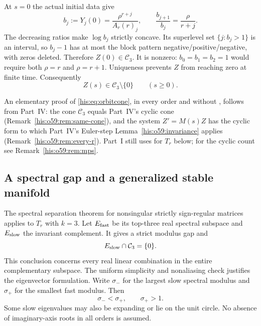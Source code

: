 At $s=0$ the actual initial data give
\begin{equation}\label{his:eq:bjet}
 b_j:=Y_j(0)=\frac{\rho^{r+j}}{A_r(r)_j},\qquad
 \frac{b_{j+1}}{b_j}=\frac{\rho}{r+j}.
\end{equation}
The decreasing ratios make $\log b_j$ strictly concave. Its superlevel set $\{j:b_j>1\}$ is an interval, so $b_j-1$ has at most the block pattern negative/positive/negative, with zeros deleted. Therefore $Z(0)\in\mathcal C_3$. It is nonzero: $b_0=b_1=b_2=1$ would require both $\rho=r$ and $\rho=r+1$. Uniqueness prevents $Z$ from reaching zero at finite time. Consequently
\begin{equation}\label{his:eq:orbitcone}
 Z(s)\in\mathcal C_3\setminus\{0\}\qquad(s\ge0).
\end{equation}
\begin{writenote}
An elementary proof of \eqref{his:eq:orbitcone}, in every order and without \cite{weiss2021}, follows from Part~IV: the cone $\mathcal C_3$ equals Part~IV's cyclic cone (Remark~\ref{his:o59:rem:same-cone}), and the system $Z'=M(s)Z$ has the cyclic form to which Part~IV's Euler-step Lemma~\ref{his:o59:invariance} applies (Remark~\ref{his:o59:rem:every-r}). Part~I still uses \cite{weiss2021} for $T_r$ below; for the cyclic count see Remark~\ref{his:o59:rem:mps}.
\end{writenote}


\subsection{A spectral gap and a generalized stable manifold}
The spectral separation theorem for nonsingular strictly sign-regular matrices \cite[Theorem~2(ii)--(iii)]{alseidi2019} applies to $T_r$ with $k=3$. Let $E_{\rm fast}$ be its top-three real spectral subspace and $E_{\rm slow}$ the invariant complement. It gives a strict modulus gap and
\begin{equation}\label{his:eq:stablecone}
 E_{\rm slow}\cap\mathcal C_3=\{0\}.
\end{equation}
This conclusion concerns every real linear combination in the entire complementary subspace. The uniform simplicity and nonaliasing check justifies the eigenvector formulation. Write $\sigma_-$ for the largest slow spectral modulus and $\sigma_+$ for the smallest fast modulus. Then
\begin{equation}\label{his:eq:spectralgap}
 \sigma_-<\sigma_+,
 \qquad \sigma_+>1.
\end{equation}
Some slow eigenvalues may also be expanding or lie on the unit circle. No absence of imaginary-axis roots in all orders is assumed.

